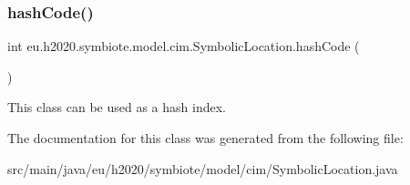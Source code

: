 \subsubsection{\texorpdfstring{hash\+Code()}{hashCode()}}
{\footnotesize\ttfamily int eu.\+h2020.\+symbiote.\+model.\+cim.\+Symbolic\+Location.\+hash\+Code (\begin{DoxyParamCaption}{ }\end{DoxyParamCaption})}

This class can be used as a hash index. 

The documentation for this class was generated from the following file\+:\begin{DoxyCompactItemize}
\item 
src/main/java/eu/h2020/symbiote/model/cim/Symbolic\+Location.\+java\end{DoxyCompactItemize}
